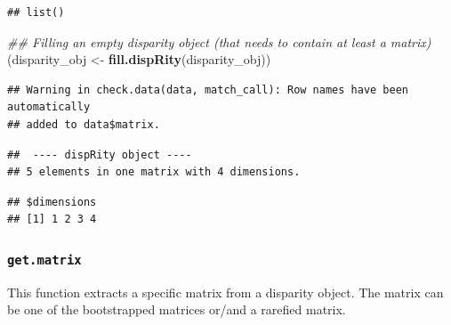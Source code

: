 \documentclass[
]{book}
\newenvironment{Shaded}{\begin{snugshade}}{\end{snugshade}}
\newcommand{\CommentTok}[1]{\textcolor[rgb]{0.56,0.35,0.01}{\textit{#1}}}
\newcommand{\KeywordTok}[1]{\textcolor[rgb]{0.13,0.29,0.53}{\textbf{#1}}}
\newcommand{\NormalTok}[1]{#1}
\newcommand{\OperatorTok}[1]{\textcolor[rgb]{0.81,0.36,0.00}{\textbf{#1}}}
\newcommand{\StringTok}[1]{\textcolor[rgb]{0.31,0.60,0.02}{#1}}
\begin{document}
\begin{Shaded}
\end{Shaded}

\begin{verbatim}
## list()
\end{verbatim}

\begin{Shaded}
\begin{Highlighting}[]
\CommentTok{\#\# Filling an empty disparity object (that needs to contain at least a matrix)}
\NormalTok{(disparity\_obj \textless{}{-}}\StringTok{ }\KeywordTok{fill.dispRity}\NormalTok{(disparity\_obj))}
\end{Highlighting}
\end{Shaded}

\begin{verbatim}
## Warning in check.data(data, match_call): Row names have been automatically
## added to data$matrix.
\end{verbatim}

\begin{verbatim}
##  ---- dispRity object ---- 
## 5 elements in one matrix with 4 dimensions.
\end{verbatim}

\begin{Shaded}
\end{Shaded}

\begin{verbatim}
## $dimensions
## [1] 1 2 3 4
\end{verbatim}

\hypertarget{get.matrix}{%
\subsubsection{\texorpdfstring{\texttt{get.matrix}}{get.matrix}}\label{get.matrix}}

This function extracts a specific matrix from a disparity object.
The matrix can be one of the bootstrapped matrices or/and a rarefied matrix.
\end{document}
